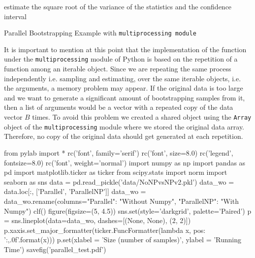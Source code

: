 \documentclass[11pt]{article}
\begin{document}
\begin{algorithm}[H]
    estimate the square root of the variance of the statistics and the confidence interval
\caption{Parallel Bootstrapping Example with \texttt{multiprocessing module}}\label{alg:ABPar2}
\end{algorithm}

\medskip

It is important to mention at this point that the implementation of the function under the \texttt{multiprocessing} module
of Python is based on the repetition of a function among an iterable object. Since we are repeating the same process independently
i.e. sampling and estimating, over the same iterable objects, i.e. the arguments\footnotemark, a memory problem may appear. If the original
data is too large and we want to generate a significant amount of bootstrapping samples from it, then a list of arguments
would be a vector with a repeated copy of the data vector $B$ times. To avoid this problem we created a shared object using
the \texttt{Array} object of the \texttt{multiprocessing} module where we stored the original data array. Therefore, no
copy of the original data should get generated at each repetition.


\medskip

\begin{pycode}
from pylab import *
rc('font', family='serif')
rc('font', size=8.0)
rc('legend', fontsize=8.0)
rc('font', weight='normal')
import numpy as np
import pandas as pd
import matplotlib.ticker as ticker
from scipy.stats import norm
import seaborn as sns
data = pd.read_pickle('data/NoNPvsNPv2.pkl')
data_wo = data.loc[:, ['Parallel', 'ParallelNP']]
data_wo = data_wo.rename(columns={"Parallel": "Without Numpy", "ParallelNP": "With Numpy"})
clf()
figure(figsize=(5, 4.5))
sns.set(style='darkgrid', palette='Paired')
p = sns.lineplot(data=data_wo, dashes=[(None, None), (2, 2)])
p.xaxis.set_major_formatter(ticker.FuncFormatter(lambda x, pos: '{:,.0f}'.format(x)))
p.set(xlabel = 'Size (number of samples)', ylabel = 'Running Time')
savefig('parallel_test.pdf')
\end{pycode}
\end{document}
